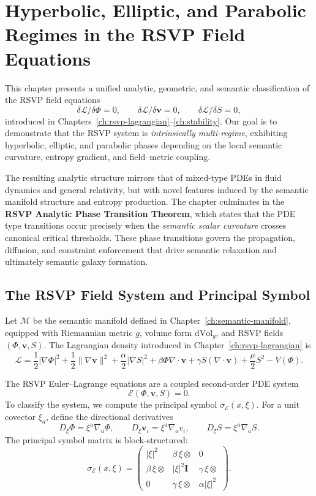 \chapter{Hyperbolic, Elliptic, and Parabolic Regimes in the RSVP Field Equations}
\label{ch:hyperbolic-parabolic-elliptic}

This chapter presents a unified analytic, geometric, and semantic
classification of the RSVP field equations
\[
\delta \mathcal{L}/\delta \Phi = 0, 
\qquad
\delta \mathcal{L}/\delta \mathbf{v} = 0,
\qquad
\delta \mathcal{L}/\delta S = 0,
\]
introduced in Chapters~\ref{ch:rsvp-lagrangian}–\ref{ch:stability}.
Our goal is to demonstrate that the RSVP system is
\emph{intrinsically multi-regime}, exhibiting
hyperbolic, elliptic, and parabolic phases
depending on the local semantic curvature, entropy gradient, and
field–metric coupling.

The resulting analytic structure mirrors that of mixed-type PDEs in
fluid dynamics and general relativity, but with novel features induced by
the semantic manifold structure and entropy production.
The chapter culminates in the
\textbf{RSVP Analytic Phase Transition Theorem},
which states that the PDE type transitions
occur precisely when the \emph{semantic scalar curvature}
crosses canonical critical thresholds.
These phase transitions govern the propagation, diffusion, and constraint
enforcement that drive semantic relaxation and ultimately semantic galaxy formation.

\section{The RSVP Field System and Principal Symbol}

Let $\mathcal{M}$ be the semantic manifold
defined in Chapter~\ref{ch:semantic-manifold},
equipped with Riemannian metric $g$, volume form $\mathrm{dVol}_g$,
and RSVP fields $(\Phi, \mathbf{v}, S)$.
The Lagrangian density introduced in Chapter~\ref{ch:rsvp-lagrangian}
is
\[
\mathcal{L}
=
\frac12 |\nabla \Phi|^2
+ \frac{1}{2} \|\nabla \mathbf{v}\|^2
+ \frac{\alpha}{2} |\nabla S|^2
+ \beta \Phi \nabla \cdot \mathbf{v}
+ \gamma S (\nabla \cdot \mathbf{v})
+ \frac{\mu}{2} S^2
- V(\Phi).
\]

The RSVP Euler–Lagrange equations are a coupled second-order PDE system
\[
\mathcal{E}(\Phi, \mathbf{v}, S) = 0.
\]
To classify the system, we compute the principal symbol
$\sigma_{\mathcal{E}}(x,\xi)$.
For a unit covector $\xi_a$, define the directional derivatives
\[
D_\xi \Phi = \xi^a \nabla_a \Phi,
\qquad
D_\xi \mathbf{v}_i = \xi^a \nabla_a v_i,
\qquad
D_\xi S = \xi^a \nabla_a S.
\]
The principal symbol matrix is block-structured:
\[
\sigma_{\mathcal{E}}(x,\xi)
=
\begin{pmatrix}
|{\xi}|^2                & \beta \,\xi \otimes & 0 \\
\beta \,\xi \otimes      & |\xi|^2 \mathbf{I}  & \gamma\, \xi\otimes \\
0                       & \gamma\, \xi\otimes & \alpha |\xi|^2
\end{pmatrix}.
\]

